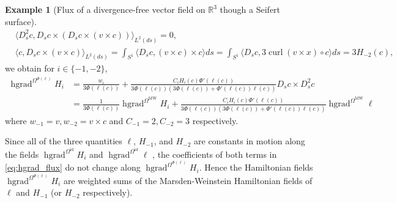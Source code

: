 \documentclass[12pt]{amsart}
\newcommand{\rev}[1]{#1}
\theoremstyle{definition}
\newtheorem{example}[theorem]{Example}
\newcommand{\R}{\mathbb R}
\newcommand{\OmMW}{\Omega^{\operatorname{MW}}}
\def\Ph{\Phi}
\def\Om{\Omega}
\def\x{\times}
\def\R{{\mathbb R}}
\let\on=\operatorname
\begin{document}
\begin{example}[Flux of a divergence-free vector field on $\R^3$ though a Seifert surface]
\begin{align}
    &\langle D^2_s c, D_s c\x ( D_s c \x (v\x c)) \rangle_{L^2(ds)}=0,\\
    &\langle c, D_s c \x (v\x c) \rangle_{L^2(ds)}
    =\int_{S^1} \langle D_s c, (v\x c)\x c \rangle ds = \int_{S^1} \langle D_s c, 3 \on{curl}(v\x x)\circ c\rangle ds =  3H_{-2}(c),
\end{align}
     we obtain for $i\in \{-1, -2\}$,
 \begin{align}\label{eq:hgrad_flux}
    \on{hgrad}^{\Om^{\Phi(\ell)}} H_{i}
     &= \frac{w_i}{3\Phi(\rev{\ell(c)})}+\frac{C_i H_{i}(c)\Phi'(\rev{\ell(c)})}{3\Phi(\rev{\ell(c)})(3\Phi(\rev{\ell(c)})+\Ph'(\rev{\ell(c)})\rev{\ell(c)})}D_s c\times D_s^2 c\\
     &= \frac{1}{3\Phi(\rev{\ell(c)})} \on{hgrad}^{\OmMW} H_{i}  + \frac{C_i H_{i}(c)\Phi'(\rev{\ell(c)})}{3\Phi(\rev{\ell(c)})(3\Phi(\rev{\ell(c)})+\Ph'(\rev{\ell(c)})\rev{\ell(c)})}  \on{hgrad}^{\OmMW} \ell
 \end{align}
where $w_{-1}=v, w_{-2}=v\x c$  and $C_{-1}=2, C_{-2}=3$ respectively.

Since all of the three quantities $\ell$, $H_{-1}$, and $ H_{-2}$ are constants in motion along the fields $\on{hgrad}^{\Om^{\on{id}}}H_i$ and $\on{hgrad}^{\Om^{\on{id}}}\ell$ \cite[Corollary 1]{chern_knöppel_pedit_pinkall_2020}, the coefficients of  both terms in \eqref{eq:hgrad_flux}  do not change along $\on{hgrad}^{\Om^{\Phi(\ell)}} H_i$. Hence the Hamiltonian fields $\on{hgrad}^{\Om^{\Phi(\ell)}} H_i$ are weighted sums of the Marsden-Weinstein Hamiltonian fields of \(\ell\) and \(H_{-1}\) (or \(H_{-2}\) respectively). 
\end{example}
\end{document}
